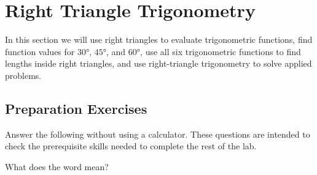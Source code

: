 



\section{Right Triangle Trigonometry} \label{section-right-triangle-trigonometry}
In this section we will use right triangles to evaluate trigonometric functions, find function values for $\ang{30}$, $\ang{45}$, and $\ang{60}$, use all six trigonometric functions to find lengths inside right triangles, and use right-triangle trigonometry to solve applied problems.


\subsection*{Preparation Exercises} \label{preparation-exercises-section-right-triangle-trigonometry}

Answer the following without using a calculator. These questions are intended to check the prerequisite skills needed to complete the rest of the lab.

\begin{myPrep}
	What does the word  mean?
	\vfill
\end{myPrep}

